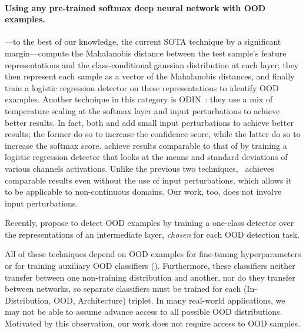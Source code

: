 \documentclass{article}
\begin{document}
\paragraph{Using any pre-trained softmax deep neural network with OOD examples.} \cite{lee2018simple}---to the best of our knowledge, the current SOTA technique by a significant margin---compute the Mahalanobis distance between the test sample's feature representations and the class-conditional gaussian distribution at each layer; they then represent each sample as a vector of the Mahalanobis distances, and finally train a logistic regression detector on these representations to identify OOD examples. Another technique in this category is ODIN~\citep{liang2017enhancing}: they use a mix of temperature scaling at the softmax layer and input perturbations to achieve better results. In fact, both \cite{lee2018simple} and \cite{liang2017enhancing} add small input perturbations to achieve better results; the former do so to increase the confidence score, while the latter do so to increase the softmax score. \cite{quintanilha2019detecting} achieve results comparable to that of \cite{lee2018simple} by training a logistic regression detector that looks at the means and standard deviations of various channels activations. Unlike the previous two techniques,~\cite{quintanilha2019detecting} achieves comparable results even without the use of input perturbations, which allows it to be applicable to non-continuous domains. Our work, too, does not involve input
perturbations.

Recently, \cite{abdelzad2019detecting} propose to detect OOD examples by training a one-class detector over the representations of an intermediate layer, \textit{chosen} for each OOD detection task.

All of these techniques depend on OOD examples for fine-tuning hyperparameters \citep{liang2017enhancing, abdelzad2019detecting} or for training auxiliary OOD classifiers (\cite{lee2018simple,quintanilha2019detecting}).
Furthermore, these classifiers neither transfer between one non-training distribution and another, nor do they transfer between networks, so separate classifiers must be trained for each (In-Distribution, OOD, Architecture) triplet. In many real-world applications, we may not be able to assume advance access to all possible OOD distributions. Motivated by this observation, our work does not require access to OOD samples.
\end{document}

